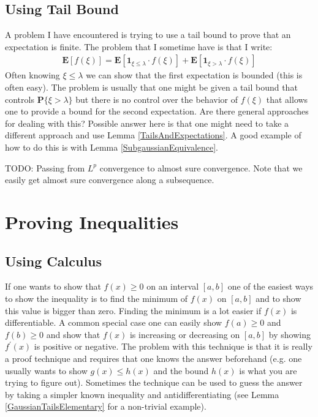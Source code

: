 \documentclass{amsbook}
\theoremstyle{definition}
\theoremstyle{remark}
\newcommand{\expectation}[1]{\textbf{E}\left[#1\right]}
\newcommand{\probability}[1]{\textbf{P}\{#1\}}
\newcommand{\characteristic}[1]{\textbf{1}_{#1}}
\begin{document}
\subsection{Using Tail Bound}
A problem I have encountered is trying to use a tail bound to prove
that an expectation is finite.  The problem that I sometime have is
that I write:
\begin{align*}
\expectation{f(\xi)} = \expectation{ \characteristic{\xi \leq \lambda}
  \cdot f(\xi)} + \expectation{\characteristic{\xi > \lambda} \cdot f(\xi)}
\end{align*}
Often knowing $\xi \leq \lambda$ we can show that the first
expectation is bounded (this is often easy).  The problem is usually
that one might be given a tail bound that controls $\probability{\xi >
  \lambda}$ but there is no control over the behavior of $f(\xi)$ that
allows one to provide a bound for the second expectation.  Are there
general approaches for dealing with this?  Possible answer here is
that one might need to take a different approach and use Lemma
\ref{TailsAndExpectations}.  A good example of how to do this is with 
Lemma \ref{SubgaussianEquivalence}.

TODO: Passing from $L^p$ convergence to almost sure convergence.  Note
that we easily get almost sure convergence along a subsequence.

\section{Proving Inequalities}
\subsection{Using Calculus}
If one wants to show that $f(x) \geq 0$ on an interval $[a,b]$ one of
the easiest ways to show the inequality is to find the minimum of
$f(x)$ on $[a,b]$ and to show this value is bigger than zero.  Finding
the minimum is a lot easier if $f(x)$ is differentiable.  A common
special case one can easily show $f(a) \geq 0$ and $f(b) \geq
0$ and show that $f(x)$ is increasing or decreasing on $[a,b]$ by
showing $f^{\prime}(x)$ is positive or negative.  The problem with
this technique is that it is really a proof technique and requires
that one knows the answer beforehand (e.g. one usually wants to show
$g(x) \leq h(x)$ and the bound $h(x)$ is what you are trying to figure
out).  Sometimes the technique can be
used to guess the answer by taking a simpler known inequality and
antidifferentiating (see Lemma \ref{GaussianTailsElementary} for a
non-trivial example).
\end{document}
